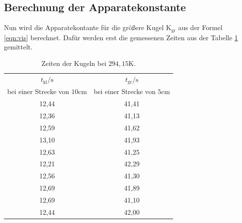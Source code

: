 \subsection{Berechnung der Apparatekonstante}
Nun wird die Apparatekontante für die größere Kugel $\mathrm{K}_{\mathrm{gr}}$ aus
der Formel \eqref{eqn:vis} berechnet. Dafür werden erst die gemessenen Zeiten aus der Tabelle \ref{tab:kg}
gemittelt.
\begin{table}
  \centering
  \caption{Zeiten der Kugeln bei $294,15\si{\kelvin}$.}
  \label{tab:kg}
  \begin{tabular}{c c}
  \toprule
  $t_{\mathrm{kl}}/\si{\second}$ & $t_{\mathrm{gr}}/\si{\second}$ \\
bei einer Strecke von $10\si{\centi\meter}$ & bei einer Strecke von $5\si{\centi\meter}$\\
\midrule
12,44   & 41,41\\
12,36   & 41,13\\
12,59  	& 41,62\\
13,10   & 41,93\\
12,63   & 41,25\\
12,21   & 42,29\\
12,56   & 41,30\\
12,69   & 41,89\\
12,69   & 41,10\\
12,44   & 42,00\\
\bottomrule
  \end{tabular}
\end{table}

